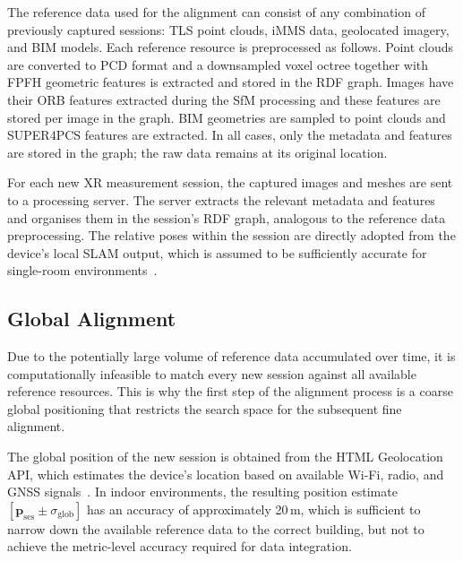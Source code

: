 The reference data used for the alignment can consist of any combination of previously captured sessions: \gls{TLS} point clouds, \gls{iMMS} data, geolocated imagery, and \gls{BIM} models. Each reference resource is preprocessed as follows. Point clouds are converted to PCD format and a downsampled voxel octree together with \gls{FPFH} geometric features is extracted and stored in the RDF graph. Images have their \gls{ORB} features extracted during the \gls{SfM} processing and these features are stored per image in the graph. BIM geometries are sampled to point clouds and \gls{SUPER4PCS} features are extracted. In all cases, only the metadata and features are stored in the graph; the raw data remains at its original location.

For each new XR measurement session, the captured images and meshes are sent to a processing server. The server extracts the relevant metadata and features and organises them in the session's RDF graph, analogous to the reference data preprocessing. The relative poses within the session are directly adopted from the device's local SLAM output, which is assumed to be sufficiently accurate for single-room environments~\cite{geyter_point_2022}.

\subsection{Global Alignment}
\label{sec:4_global}

Due to the potentially large volume of reference data accumulated over time, it is computationally infeasible to match every new session against all available reference resources. This is why the first step of the alignment process is a coarse global positioning that restricts the search space for the subsequent fine alignment.

The global position of the new session is obtained from the HTML Geolocation \gls{API}, which estimates the device's location based on available Wi-Fi, radio, and \gls{GNSS} signals~\cite{vermandere_two-step_2022}. In indoor environments, the resulting position estimate $[\mathbf{p}_\text{ses} \pm \sigma_\text{glob}]$ has an accuracy of approximately 20\,m, which is sufficient to narrow down the available reference data to the correct building, but not to achieve the metric-level accuracy required for data integration.

